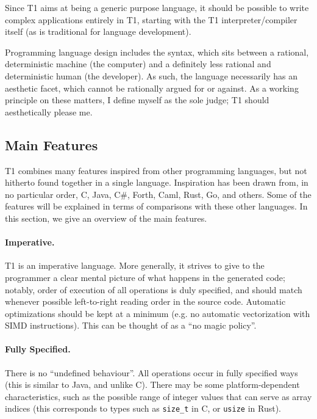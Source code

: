 Since T1 aims at being a generic purpose language, it should be possible
to write complex applications entirely in T1, starting with the T1
interpreter/compiler itself (as is traditional for language
development).

Programming language design includes the syntax, which sits between a
rational, deterministic machine (the computer) and a definitely less
rational and deterministic human (the developer). As such, the language
necessarily has an aesthetic facet, which cannot be rationally argued
for or against. As a working principle on these matters, I define myself
as the sole judge; T1 should aesthetically please me.

\subsection{Main Features}

T1 combines many features inspired from other programming languages, but
not hitherto found together in a single language. Inspiration has been
drawn from, in no particular order, C, Java, C\#, Forth, Caml, Rust, Go,
and others. Some of the features will be explained in terms of
comparisons with these other languages. In this section, we give an
overview of the main features.

\paragraph{Imperative.} T1 is an imperative language. More generally, it
strives to give to the programmer a clear mental picture of what happens
in the generated code; notably, order of execution of all operations is
duly specified, and should match whenever possible left-to-right reading
order in the source code. Automatic optimizations should be kept at a
minimum (e.g. no automatic vectorization with SIMD instructions). This
can be thought of as a ``no magic policy''.

\paragraph{Fully Specified.} There is no ``undefined behaviour''. All
operations occur in fully specified ways (this is similar to Java, and
unlike C). There may be some platform-dependent characteristics, such as
the possible range of integer values that can serve as array indices
(this corresponds to types such as \verb|size_t| in C, or \verb|usize|
in Rust).

